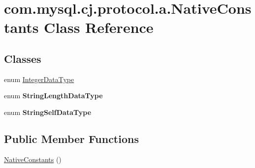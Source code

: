 \hypertarget{classcom_1_1mysql_1_1cj_1_1protocol_1_1a_1_1_native_constants}{}\section{com.\+mysql.\+cj.\+protocol.\+a.\+Native\+Constants Class Reference}
\label{classcom_1_1mysql_1_1cj_1_1protocol_1_1a_1_1_native_constants}
\subsection*{Classes}
\begin{DoxyCompactItemize}
\item 
enum \mbox{\hyperlink{enumcom_1_1mysql_1_1cj_1_1protocol_1_1a_1_1_native_constants_1_1_integer_data_type}{Integer\+Data\+Type}}
\item 
enum {\bfseries String\+Length\+Data\+Type}
\item 
enum {\bfseries String\+Self\+Data\+Type}
\end{DoxyCompactItemize}
\subsection*{Public Member Functions}
\begin{DoxyCompactItemize}
\item 
\mbox{\hyperlink{classcom_1_1mysql_1_1cj_1_1protocol_1_1a_1_1_native_constants_a39c2f82cb492ad58cbdfb80b3d82d85d}{Native\+Constants}} ()
\end{DoxyCompactItemize}
